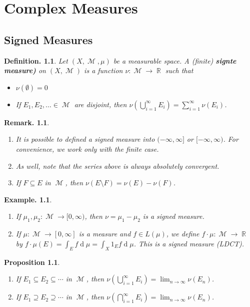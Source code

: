 \documentclass[12pt, a4paper]{memoir}
\DeclareMathOperator{\R}{{\mathbb{R}}}
\newtheorem{proposition}[theorem]{Proposition}
\theoremstyle{nonumberplain}
\newtheorem{definition}{Definition.}
\newtheorem{example}{Example.}
\newtheorem{remark}{Remark.}
\DeclareMathOperator{\M}{\mathcal{M}}
\renewcommand{\d}[1]{\ensuremath{\operatorname{d}\!{#1}}} %
\begin{document}
\chapter{Complex Measures}
\section{Signed Measures}
\begin{definition}
    Let $(X,\M,\mu)$ be a measurable space.
    A (finite) \textbf{signte measure)} on $(X,\M)$ is a function $\nu:\M\to\R$ such that
    \begin{itemize}[nolistsep]
        \item $\nu(\emptyset)=0$
        \item If $E_1,E_2,\ldots\in\M$ are disjoint, then $\nu\left(\bigcup_{i=1}^\infty E_i\right)=\sum_{i=1}^\infty\nu(E_i)$.
    \end{itemize}
\end{definition}
\begin{remark}
    \begin{enumerate}[nolistsep]
        \item It is possible to defined a signed measure into $(-\infty,\infty]$ or $[-\infty,\infty)$. %
            For convenience, we work only with the finite case.
        \item As well, note that the series above is always absolutely convergent.
        \item If $F\subseteq E$ in $\M$, then $\nu(E\setminus F)=\nu(E)-\nu(F)$.
    \end{enumerate}
\end{remark}
\begin{example}
    \begin{enumerate}[nolistsep]
        \item If $\mu_1,\mu_2:\M\to[0,\infty)$, then $\nu=\mu_1-\mu_2$ is a signed measure. %
        \item If $\mu:\M\to[0,\infty]$ is a measure and $f\in L(\mu)$, we define $f\cdot\mu:\M\to\R$ by $f\cdot\mu(E)=\int_E f\d{\mu}=\int_X 1_E f\d{\mu}$.
            This is a signed measure (LDCT).
    \end{enumerate}
\end{example}
\begin{proposition}
    \begin{enumerate}[nolistsep,label=(\roman*)]
        \item If $E_1\subseteq E_2\subseteq\cdots$ in $\M$, then $\nu\left(\bigcup_{i=1}^\infty E_i\right)=\lim_{n\to\infty}\nu(E_n)$.
        \item If $E_1\supseteq E_2\supseteq\cdots$ in $\M$, then $\nu\left(\bigcap_{i=1}^\infty E_i\right)=\lim_{n\to\infty}\nu(E_n)$.
    \end{enumerate}
\end{proposition}
\end{document}
